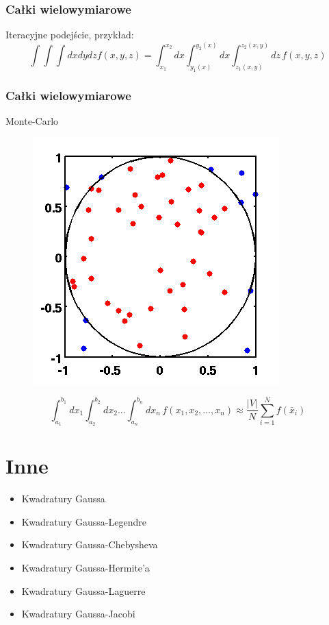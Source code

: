 \documentclass[compress,red]{beamer}
\begin{document}
\begin{frame}
  \frametitle{Całki wielowymiarowe}
  Iteracyjne podejście, przykład:
  \[
  \int\int\int dxdydzf(x,y,z) = 
  \int_{x_1}^{x_{2}}dx \int_{y_1(x)}^{y_2(x)}dx
  \int_{z_1(x,y)}^{z_2(x,y)}dz\,f(x,y,z)
  \]
\end{frame}

\begin{frame}
  \frametitle{Całki wielowymiarowe}
  Monte-Carlo
  \begin{figure}
  \includegraphics[scale=0.4]{./img/MonteCarloIntegrationCircle.png}
  \end{figure}
  \[  
  \int_{a_1}^{b_1}dx_1 \int_{a_2}^{b_2}dx_2 \ldots
  \int_{a_n}^{b_n}dx_n\,f(x_1,x_2,\ldots,x_n) \approx
  \frac{|V|}{N}\sum_{i=1}^{N}f(\bar{x}_i)
  \]
\end{frame}

\section{Inne}
\begin{frame}
  \begin{itemize}
  \item Kwadratury Gaussa
  \item Kwadratury Gaussa-Legendre
  \item Kwadratury Gaussa-Chebysheva
  \item Kwadratury Gaussa-Hermite'a
  \item Kwadratury Gaussa-Laguerre
  \item Kwadratury Gaussa-Jacobi
  \end{itemize}
\end{frame}
\end{document}
